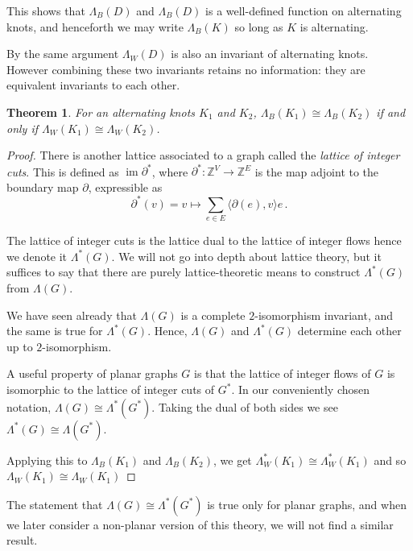 \documentclass[12pt]{report}
\newcommand{\Z}{\mathbb{Z}}
\newtheorem*{theorem}{Theorem}
\begin{document}
This shows that $\Lambda_{B}(D)$ and $\Lambda_{B}(D)$ is a well-defined function on alternating knots, and henceforth we may write $\Lambda_{B}(K)$ so long as $K$ is alternating.

By the same argument $\Lambda_{W}(D)$ is also an invariant of alternating knots. However combining these two invariants retains no information: they are equivalent invariants to each other.

\begin{theorem}
For an alternating knots $K_{1}$ and $K_{2}$, $\Lambda_{B}(K_{1}) \cong \Lambda_{B}(K_{2})$ if and only if $\Lambda_{W}(K_{1}) \cong \Lambda_{W}(K_{2})$.
\end{theorem}

\begin{proof}
There is another lattice associated to a graph called the \textit{lattice of integer cuts}. This is defined as $\operatorname{im} \partial^{*}$, where $\partial^{*}: \Z^{V} \longrightarrow \Z^{E}$ is the map adjoint to the boundary map $\partial$, expressible as
\[\partial^{*}(v) = v \longmapsto \sum_{e \in E} \langle \partial(e), v \rangle e\,.\]

The lattice of integer cuts is the lattice dual to the lattice of integer flows hence we denote it $\Lambda^{*}(G)$. We will not go into depth about lattice theory, but it suffices to say that there are purely lattice-theoretic means to construct $\Lambda^{*}(G)$ from $\Lambda(G)$.

We have seen already that $\Lambda(G)$ is a complete $2$-isomorphism invariant, and the same is true for $\Lambda^{*}(G)$. Hence, $\Lambda(G)$ and $\Lambda^{*}(G)$ determine each other up to $2$-isomorphism.

A useful property of planar graphs $G$ is that the lattice of integer flows of $G$ is isomorphic to the lattice of integer cuts of $G^{*}$. In our conveniently chosen notation, $\Lambda(G) \cong \Lambda^{*}(G^{*})$. Taking the dual of both sides we see $\Lambda^{*}(G) \cong \Lambda(G^{*})$.

Applying this to $\Lambda_{B}(K_{1})$ and $\Lambda_{B}(K_{2})$, we get
$\Lambda_{W}^{*}(K_{1}) \cong \Lambda_{W}^{*}(K_{1})$ and so $\Lambda_{W}(K_{1}) \cong \Lambda_{W}(K_{1})$
\end{proof}

The statement that $\Lambda(G) \cong \Lambda^{*}(G^{*})$ is true only for planar graphs, and when we later consider a non-planar version of this theory, we will not find a similar result.
\end{document}
